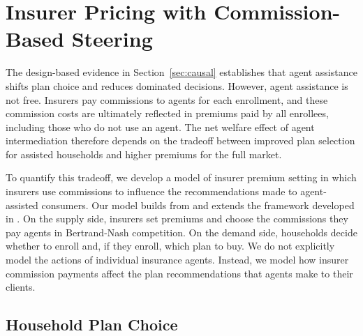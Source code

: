 \documentclass[12pt]{article}
\begin{document}
\section{Insurer Pricing with Commission-Based Steering}
\label{sec:structural}

The design-based evidence in Section~\ref{sec:causal} establishes that agent assistance shifts plan choice and reduces dominated decisions. However, agent assistance is not free. Insurers pay commissions to agents for each enrollment, and these commission costs are ultimately reflected in premiums paid by all enrollees, including those who do not use an agent. The net welfare effect of agent intermediation therefore depends on the tradeoff between improved plan selection for assisted households and higher premiums for the full market. 

To quantify this tradeoff, we develop a model of insurer premium setting in which insurers use commissions to influence the recommendations made to agent-assisted consumers.  Our model builds from and extends the framework developed in \citet{saltzman2025}.  On the supply side, insurers set premiums and choose the commissions they pay agents in Bertrand-Nash competition. On the demand side, households decide whether to enroll and, if they enroll, which plan to buy. We do not explicitly model the actions of individual insurance agents. Instead, we model how insurer commission payments affect the plan recommendations that agents make to their clients.

\subsection{Household Plan Choice}
\label{subsec:demand}
\end{document}
